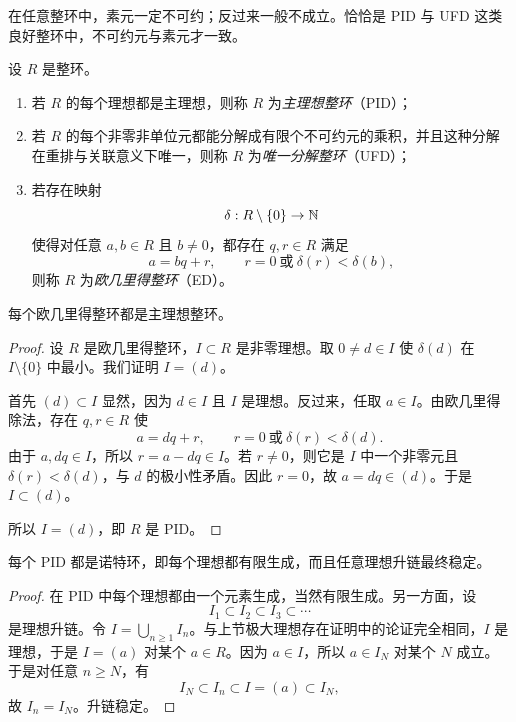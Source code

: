 \begin{remark}
在任意整环中，素元一定不可约；反过来一般不成立。恰恰是 PID 与 UFD 这类良好整环中，不可约元与素元才一致。
\end{remark}

\begin{definition}
设 $R$ 是整环。
\begin{enumerate}[label=\textnormal{(\arabic*)}]
  \item 若 $R$ 的每个理想都是主理想，则称 $R$ 为\emph{主理想整环}（PID）；
  \item 若 $R$ 的每个非零非单位元都能分解成有限个不可约元的乘积，并且这种分解在重排与关联意义下唯一，则称 $R$ 为\emph{唯一分解整环}（UFD）；
  \item 若存在映射
  \[
  \delta:R\setminus\{0\}\to \mathbb{N}
  \]
  使得对任意 $a,b\in R$ 且 $b\neq 0$，都存在 $q,r\in R$ 满足
  \[
  a=bq+r,
  \qquad r=0\ \text{或}\ \delta(r)<\delta(b),
  \]
  则称 $R$ 为\emph{欧几里得整环}（ED）。
\end{enumerate}
\end{definition}

\begin{theorem}
每个欧几里得整环都是主理想整环。
\end{theorem}

\begin{proof}
设 $R$ 是欧几里得整环，$I\subset R$ 是非零理想。取 $0\neq d\in I$ 使 $\delta(d)$ 在 $I\setminus\{0\}$ 中最小。我们证明 $I=(d)$。

首先 $(d)\subset I$ 显然，因为 $d\in I$ 且 $I$ 是理想。反过来，任取 $a\in I$。由欧几里得除法，存在 $q,r\in R$ 使
\[
a=dq+r,
\qquad r=0\ \text{或}\ \delta(r)<\delta(d).
\]
由于 $a,dq\in I$，所以 $r=a-dq\in I$。若 $r\neq 0$，则它是 $I$ 中一个非零元且 $\delta(r)<\delta(d)$，与 $d$ 的极小性矛盾。因此 $r=0$，故 $a=dq\in(d)$。于是 $I\subset(d)$。

所以 $I=(d)$，即 $R$ 是 PID。
\end{proof}

\begin{proposition}
每个 PID 都是诺特环，即每个理想都有限生成，而且任意理想升链最终稳定。
\end{proposition}

\begin{proof}
在 PID 中每个理想都由一个元素生成，当然有限生成。另一方面，设
\[
I_1\subset I_2\subset I_3\subset \cdots
\]
是理想升链。令 $I=\bigcup_{n\ge 1} I_n$。与上节极大理想存在证明中的论证完全相同，$I$ 是理想，于是 $I=(a)$ 对某个 $a\in R$。因为 $a\in I$，所以 $a\in I_N$ 对某个 $N$ 成立。于是对任意 $n\ge N$，有
\[
I_N\subset I_n\subset I=(a)\subset I_N,
\]
故 $I_n=I_N$。升链稳定。
\end{proof}

